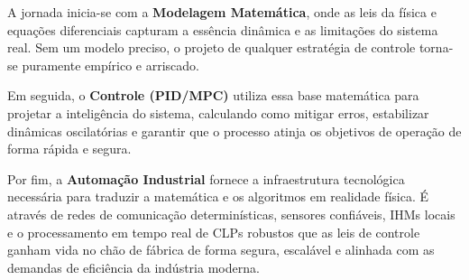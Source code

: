 \documentclass[12pt]{article}
\begin{document}
A jornada inicia-se com a \textbf{Modelagem Matemática}, onde as leis da física e equações diferenciais capturam a essência dinâmica e as limitações do sistema real. Sem um modelo preciso, o projeto de qualquer estratégia de controle torna-se puramente empírico e arriscado.

Em seguida, o \textbf{Controle (PID/MPC)} utiliza essa base matemática para projetar a inteligência do sistema, calculando como mitigar erros, estabilizar dinâmicas oscilatórias e garantir que o processo atinja os objetivos de operação de forma rápida e segura.

Por fim, a \textbf{Automação Industrial} fornece a infraestrutura tecnológica necessária para traduzir a matemática e os algoritmos em realidade física. É através de redes de comunicação determinísticas, sensores confiáveis, IHMs locais e o processamento em tempo real de CLPs robustos que as leis de controle ganham vida no chão de fábrica de forma segura, escalável e alinhada com as demandas de eficiência da indústria moderna.
\end{document}
